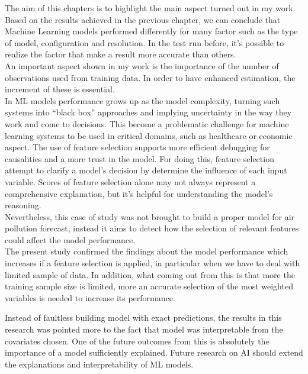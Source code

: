 The aim of this chapters is to highlight the main aspect turned out in my work.
Based on the results achieved in the previous chapter, we can conclude that Machine Learning models performed differently for many factor such as the type of model, configuration and resolution.
In the test run before, it's possible to realize the factor that make a result more accurate than others.\\
An important aspect shown in my work is the importance of the number of observations used from training data. In order to have enhanced estimation, the increment of these is essential.\\
In ML models performance grows up as the model complexity, turning such systems into “black box” approaches and implying uncertainty in the way they work and come to decisions. 
This become a problematic challenge for machine learning systems to be used in critical domains, such as healthcare or economic aspect.
The use of feature selection supports more efficient debugging for causalities and a more trust in the model.
For doing this, feature selection attempt to clarify a model’s decision by determine the influence of each input variable. 
Scores of feature selection alone may not always represent a comprehensive explanation, but it's helpful for understanding the model’s reasoning.\\
Nevertheless, this case of study was not brought to build a proper model for air pollution forecast; instead it aims to detect how the selection of relevant features could affect the model performance. \\
The present study confirmed the findings about the model performance which increases if a feature selection is applied, in particular when we have to deal with limited sample of data\cite{vabalas2019machine}. 
In addition, what coming out from this is that more the training sample size is limited, more an accurate selection of the most weighted variables is needed to increase its performance.
\begin{comment}
In this work so it's highlighted the effect of how the training in ML should benefit from an accurate selection of variable. 
\end{comment}
Instead of faultless building model with exact predictions, the results in this research was pointed more to the fact that model was interpretable from the covariates chosen. 
One of the future outcomes from this is absolutely the importance of a model sufficiently explained.
Future research on AI should extend the explanations and interpretability of ML models.
